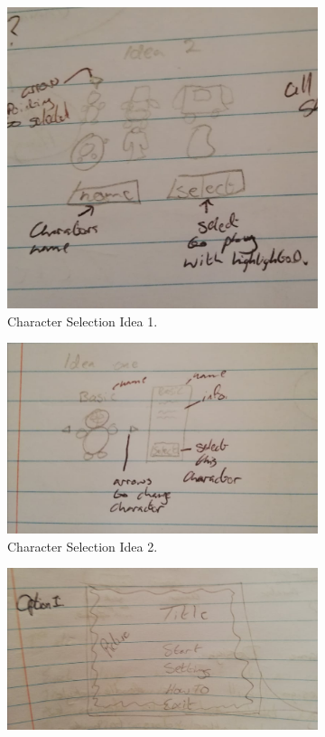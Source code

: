 \begin{figure}
\begin{subfigure}{.5\textwidth}
  \includegraphics[width= 1\linewidth]{Images/CharacterSelectionIdea.jpg}
  \caption{Character Selection Idea 1.}
  \label{fig:CharacterSelectionIdea}
  \end{subfigure}%
\begin{subfigure}{.5\textwidth}
\centering
  \includegraphics[width= 1\linewidth]{Images/CharacterSelectionIdea2.jpg}
  \caption{Character Selection Idea 2.}
  \label{fig:CharacterSelectionIdea2}
  \end{subfigure}%
  \newline
\begin{subfigure}{.5\textwidth}
\centering
  \includegraphics[width= 1\linewidth]{Images/MenuIdea.jpg}

\end{subfigure}
\end{figure}
